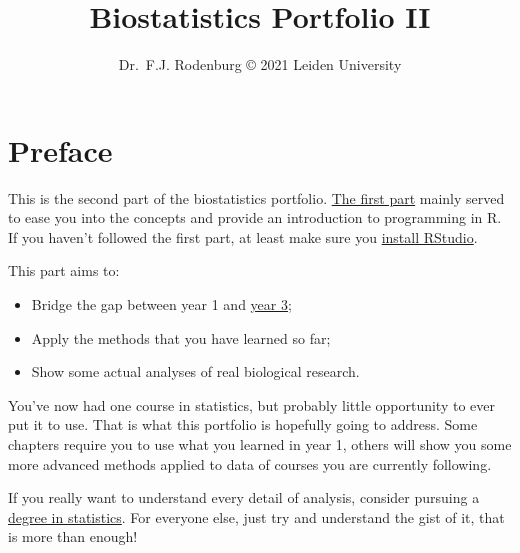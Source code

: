 \documentclass[
]{book}
\title{Biostatistics Portfolio II}
\author{Dr.~F.J. Rodenburg © 2021 Leiden University}
\date{}
\providecommand{\tightlist}{%
  \setlength{\itemsep}{0pt}\setlength{\parskip}{0pt}}
\begin{document}
\maketitle

{
\setcounter{tocdepth}{1}
\tableofcontents
}
\hypertarget{preface}{%
\chapter*{Preface}\label{preface}}

This is the second part of the biostatistics portfolio. \href{https://fransrodenburg.github.io/Biostatistics-Portfolio-I/}{The first part} mainly served to ease you into the concepts and provide an introduction to programming in R. If you haven't followed the first part, at least make sure you \href{https://youtu.be/2Sovzf6lVRo}{install RStudio}.

This part aims to:

\begin{itemize}
\tightlist
\item
  Bridge the gap between year 1 and \href{https://fransrodenburg.github.io/General-Research-Skills/}{year 3};
\item
  Apply the methods that you have learned so far;
\item
  Show some actual analyses of real biological research.
\end{itemize}

You've now had one course in statistics, but probably little opportunity to ever put it to use. That is what this portfolio is hopefully going to address. Some chapters require you to use what you learned in year 1, others will show you some more advanced methods applied to data of courses you are currently following.

If you really want to understand every detail of analysis, consider pursuing a \href{https://www.universiteitleiden.nl/en/education/study-programmes/master/statistics--data-science}{degree in statistics}. For everyone else, just try and understand the gist of it, that is more than enough!
\end{document}

